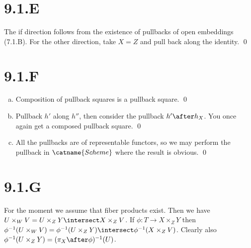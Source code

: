 \documentclass{article}
\begin{document}
\section{9.1.E}
The if direction follows from the existence of pullbacks of open embeddings
(7.1.B). For the other direction, take $X=Z$ and pull back
along the identity. \qed

\section{9.1.F}
\begin{enumerate}[a.]
	\item Composition of pullback squares is a pullback square. \qed
	\item Pullback $h'$ along $h''$, then consider the
	      pullback $h' \after h_X$. You once again get a composed pullback square.
	      \qed
	\item All the pullbacks are of representable functors, so we may perform the pullback
	      in $\catname{Scheme}$ where the result is obvious. \qed
\end{enumerate}

\section{9.1.G}
For the moment we assume that fiber products exist. Then we have
$U\times_WV = U\times_ZY \intersect X\times_ZV$. If $\phi: T \to X\times_ZY$ then
$\phi^{-1}(U\times_WV)=\phi^{-1}(U\times_ZY
	) \intersect
	\phi^{-1}(X\times_ZV)$. Clearly also $\phi^{-1}(U\times_ZY)=(\pi_X \after
	\phi)^{-1}(U)$.
\end{document}
